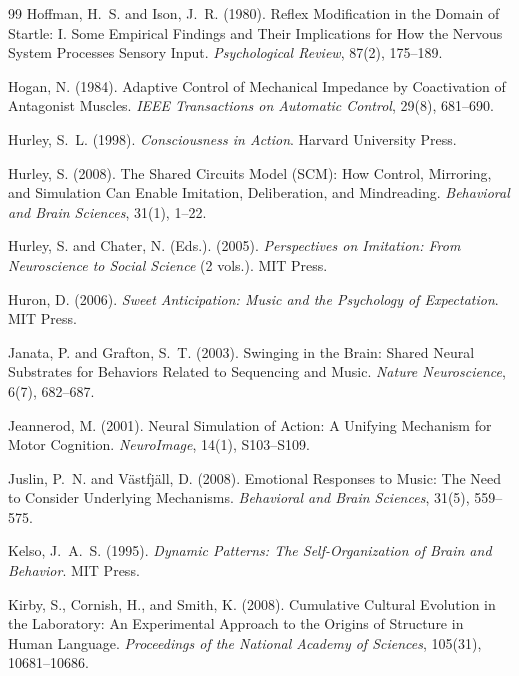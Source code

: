 \documentclass[11pt]{article}
\theoremstyle{plain}
\theoremstyle{definition}
\begin{document}
\begin{thebibliography}{99}
Hoffman, H.~S. and Ison, J.~R. (1980).
Reflex Modification in the Domain of Startle: I. Some Empirical Findings and Their Implications for How the Nervous System Processes Sensory Input.
\textit{Psychological Review}, 87(2), 175--189.

Hogan, N. (1984).
Adaptive Control of Mechanical Impedance by Coactivation of Antagonist Muscles.
\textit{IEEE Transactions on Automatic Control}, 29(8), 681--690.

Hurley, S.~L. (1998).
\textit{Consciousness in Action}.
Harvard University Press.

Hurley, S. (2008).
The Shared Circuits Model (SCM): How Control, Mirroring, and Simulation Can Enable Imitation, Deliberation, and Mindreading.
\textit{Behavioral and Brain Sciences}, 31(1), 1--22.

Hurley, S. and Chater, N. (Eds.). (2005).
\textit{Perspectives on Imitation: From Neuroscience to Social Science} (2 vols.).
MIT Press.

Huron, D. (2006).
\textit{Sweet Anticipation: Music and the Psychology of Expectation}.
MIT Press.

Janata, P. and Grafton, S.~T. (2003).
Swinging in the Brain: Shared Neural Substrates for Behaviors Related to Sequencing and Music.
\textit{Nature Neuroscience}, 6(7), 682--687.

Jeannerod, M. (2001).
Neural Simulation of Action: A Unifying Mechanism for Motor Cognition.
\textit{NeuroImage}, 14(1), S103--S109.

Juslin, P.~N. and V\"astfj\"all, D. (2008).
Emotional Responses to Music: The Need to Consider Underlying Mechanisms.
\textit{Behavioral and Brain Sciences}, 31(5), 559--575.

Kelso, J.~A.~S. (1995).
\textit{Dynamic Patterns: The Self-Organization of Brain and Behavior}.
MIT Press.

Kirby, S., Cornish, H., and Smith, K. (2008).
Cumulative Cultural Evolution in the Laboratory: An Experimental Approach to the Origins of Structure in Human Language.
\textit{Proceedings of the National Academy of Sciences}, 105(31), 10681--10686.


\end{thebibliography}
\end{document}
